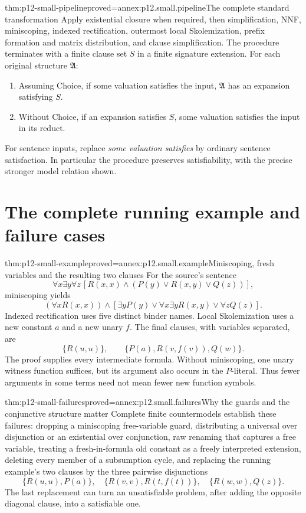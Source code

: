 \begin{hbtheorem}{thm:p12-small-pipeline}{proved=annex:p12.small.pipeline}{The complete standard transformation}
Apply existential closure when required, then simplification, NNF,
miniscoping, indexed rectification, outermost local Skolemization,
prefix formation and matrix distribution, and clause simplification.
The procedure terminates with a finite clause set \(S\) in a finite
signature extension. For each original structure \(\mathfrak A\):
\begin{enumerate}
\item Assuming Choice, if some valuation satisfies the input,
      \(\mathfrak A\) has an expansion satisfying \(S\).
\item Without Choice, if an expansion satisfies \(S\), some
      valuation satisfies the input in its reduct.
\end{enumerate}
For sentence inputs, replace \emph{some valuation satisfies} by
ordinary sentence satisfaction. In particular the procedure
preserves satisfiability, with the precise stronger model relation shown.
\end{hbtheorem}

\section{The complete running example and failure cases}

\begin{hbtheorem}{thm:p12-small-example}{proved=annex:p12.small.example}{Miniscoping, fresh variables and the resulting two clauses}
For the source's sentence
\[
 \forall x\exists y\forall z\,
       [R(x,x)\land(P(y)\lor R(x,y)\lor Q(z))],
\]
miniscoping yields
\[
 (\forall x R(x,x))\land
       [\exists y P(y)\lor\forall x\exists y R(x,y)\lor\forall z Q(z)].
\]
Indexed rectification uses five distinct binder names. Local
Skolemization uses a new constant \(a\) and a new unary \(f\).
The final clauses, with variables separated, are
\[
                     \{R(u,u)\},\qquad
                     \{P(a),R(v,f(v)),Q(w)\}.
\]
The proof supplies every intermediate formula. Without miniscoping,
one unary witness function suffices, but its argument also occurs
in the \(P\)-literal. Thus fewer arguments in some terms need not
mean fewer new function symbols.
\end{hbtheorem}

\begin{hbtheorem}{thm:p12-small-failures}{proved=annex:p12.small.failures}{Why the guards and the conjunctive structure matter}
Complete finite countermodels establish these failures:
dropping a miniscoping free-variable guard, distributing a universal
over disjunction or an existential over conjunction, raw renaming
that captures a free variable, treating a fresh-in-formula old
constant as a freely interpreted extension, deleting every member
of a subsumption cycle, and replacing the running example's two
clauses by the three pairwise disjunctions
\[
 \{R(u,u),P(a)\},\quad
 \{R(v,v),R(t,f(t))\},\quad
 \{R(w,w),Q(z)\}.
\]
The last replacement can turn an unsatisfiable problem, after adding
the opposite diagonal clause, into a satisfiable one.
\end{hbtheorem}


